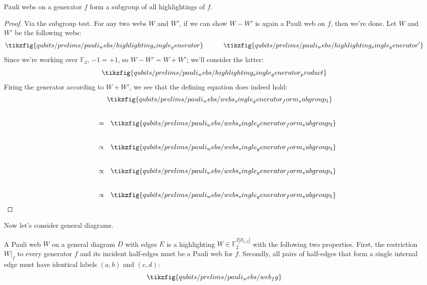 
\begin{proposition}\label{prop:pauli_webs_single_generator_form_subgroup}
    Pauli webs on a generator $f$ form a subgroup of all highlightings of $f$.
    \begin{proof}
        Via the subgroup test.
        For any two webs $W$ and $W'$, if we can show $W - W'$ is again a Pauli web on $f$, then we're done.
        Let $W$ and $W'$ be the following webs:
        \begin{equation}
            \tikzfig{qubits/prelims/pauli_webs/highlighting_single_generator}
            \qqquad
            \tikzfig{qubits/prelims/pauli_webs/highlighting_single_generator'}
        \end{equation}
        Since we're working over $\mathbb{F}_2$, $-1 = +1$, so $W - W' = W + W'$; we'll consider the latter:
        \begin{equation}
            \tikzfig{qubits/prelims/pauli_webs/highlighting_single_generator_product}
        \end{equation}
        Firing the generator according to $W + W'$, we see that the defining equation does indeed hold:
        \begingroup
        \allowdisplaybreaks
        \begin{align}
            &\phantom{~~=~~} \tikzfig{qubits/prelims/pauli_webs/webs_single_generator_form_subgroup_1} \\[20pt]
            &~~=~~ \tikzfig{qubits/prelims/pauli_webs/webs_single_generator_form_subgroup_2} \\[20pt]
            &~~ \propto ~~ \tikzfig{qubits/prelims/pauli_webs/webs_single_generator_form_subgroup_3} \\[20pt]
            &~~ \propto ~~ \tikzfig{qubits/prelims/pauli_webs/webs_single_generator_form_subgroup_4} \\[20pt]
            &~~ \propto ~~ \tikzfig{qubits/prelims/pauli_webs/webs_single_generator_form_subgroup_5}
        \end{align}
        \endgroup
    \end{proof}
\end{proposition}

Now let's consider general diagrams.

\begin{definition}\label{defn:pauli_web_general}
    A Pauli web $W$ on a general diagram $D$ with edges $E$ is a highlighting $W \in \mathbb{F}_2^{2|E_{1/2}|}$ with the following two properties.
    First, the restriction $W|_f$ to every generator $f$ and its incident half-edges must be a Pauli web for $f$.
    Secondly, all pairs of half-edges that form a single internal edge must have identical labels $(a, b)$ and $(c, d)$:
    \begin{equation}
        \tikzfig{qubits/prelims/pauli_webs/web_fg}
    \end{equation}
\end{definition}

